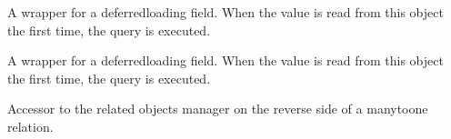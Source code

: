 \documentclass[letterpaper,10pt,english]{sphinxmanual}
\begin{document}
\begin{fulllineitems}
\begin{fulllineitems}
\end{fulllineitems}


\begin{fulllineitems}
\label{\detokenize{pages_app.models:id15}}
\pysigstartsignatures
\pysigline
{}
\pysigstopsignatures
\sphinxAtStartPar
A wrapper for a deferred\sphinxhyphen{}loading field. When the value is read from this
object the first time, the query is executed.

\end{fulllineitems}


\begin{fulllineitems}
\label{\detokenize{pages_app.models:id16}}
\pysigstartsignatures
\pysigline
{}
\pysigstopsignatures
\sphinxAtStartPar
A wrapper for a deferred\sphinxhyphen{}loading field. When the value is read from this
object the first time, the query is executed.

\end{fulllineitems}


\begin{fulllineitems}
\label{\detokenize{pages_app.models:pages_app.models.page.Page.objects}}
\pysigstartsignatures
\pysigline
{}
\pysigstopsignatures
\end{fulllineitems}


\begin{fulllineitems}
\label{\detokenize{pages_app.models:pages_app.models.page.Page.pageblock_set}}
\pysigstartsignatures
\pysigline
{}
\pysigstopsignatures
\sphinxAtStartPar
Accessor to the related objects manager on the reverse side of a
many\sphinxhyphen{}to\sphinxhyphen{}one relation.


\end{fulllineitems}
\end{fulllineitems}
\end{document}
